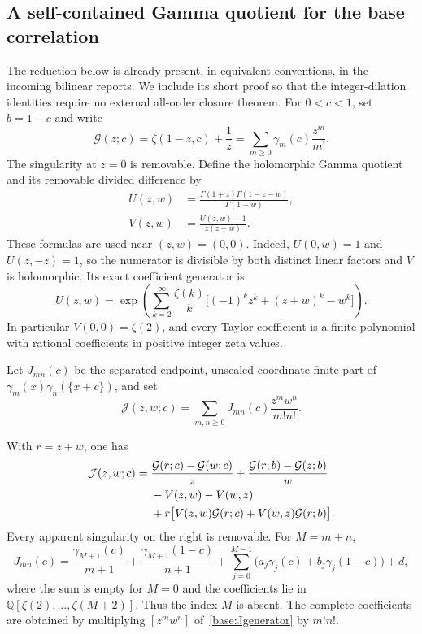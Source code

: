 \subsection{A self-contained Gamma quotient for the base correlation}
\label{base:subsection}

The reduction below is already present, in equivalent conventions, in the
incoming bilinear reports.  We include its short proof so that the
integer-dilation identities require no external all-order closure theorem.
For $0<c<1$, set $b=1-c$ and write
\[
 \mathcal G(z;c)=\zeta(1-z,c)+\frac1z
       =\sum_{m\ge0}\gamma_m(c)\frac{z^m}{m!}.
\]
The singularity at $z=0$ is removable.  Define the holomorphic Gamma
quotient and its removable divided difference by
\begin{align}
 U(z,w)&=\frac{\Gamma(1+z)\Gamma(1-z-w)}{\Gamma(1-w)},
 \label{base:U}\\
 V(z,w)&=\frac{U(z,w)-1}{z(z+w)}.
 \label{base:V}
\end{align}
These formulas are used near $(z,w)=(0,0)$.  Indeed, $U(0,w)=1$ and
$U(z,-z)=1$, so the numerator is divisible by both distinct linear
factors and $V$ is holomorphic.  Its exact coefficient generator is
\begin{equation}\label{base:Ugenerator}
 U(z,w)=\exp\left(
  \sum_{k=2}^{\infty}\frac{\zeta(k)}k
     \bigl[(-1)^kz^k+(z+w)^k-w^k\bigr]\right).
\end{equation}
In particular $V(0,0)=\zeta(2)$, and every Taylor coefficient is a finite
polynomial with rational coefficients in positive integer zeta values.

Let $J_{mn}(c)$ be the separated-endpoint, unscaled-coordinate finite
part of $\gamma_m(x)\gamma_n(\{x+c\})$, and set
\[
 \mathcal J(z,w;c)=\sum_{m,n\ge0}
                    J_{mn}(c)\frac{z^mw^n}{m!n!}.
\]

\begin{theorem}
\label{base:theorem}
With $r=z+w$, one has
\begin{align}
 \mathcal J(z,w;c)={}&
 \frac{\mathcal G(r;c)-\mathcal G(w;c)}z
 +\frac{\mathcal G(r;b)-\mathcal G(z;b)}w\notag\\
 &-V(z,w)-V(w,z)\notag\\
 &+r\bigl[V(z,w)\mathcal G(r;c)
                  +V(w,z)\mathcal G(r;b)\bigr].
 \label{base:Jgenerator}
\end{align}
Every apparent singularity on the right is removable.  For $M=m+n$,
\begin{equation}\label{base:topandmissing}
 J_{mn}(c)=\frac{\gamma_{M+1}(c)}{m+1}
          +\frac{\gamma_{M+1}(1-c)}{n+1}
          +\sum_{j=0}^{M-1}
               \bigl(a_j\gamma_j(c)+b_j\gamma_j(1-c)\bigr)+d,
\end{equation}
where the sum is empty for $M=0$ and the coefficients lie in
$\mathbb Q[\zeta(2),\ldots,\zeta(M+2)]$.  Thus the index $M$ is absent.
The complete coefficients are obtained by multiplying
$[z^mw^n]$ of~\eqref{base:Jgenerator} by $m!n!$.
\end{theorem}

